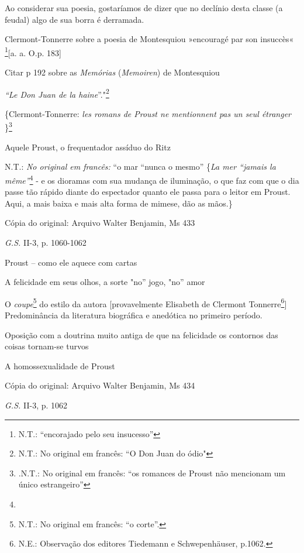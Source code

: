 Ao considerar sua poesia, gostaríamos de dizer que no declínio desta
classe (a feudal) algo de sua borra é derramada.

Clermont-Tonnerre sobre a poesia de Montesquiou »encouragé par son
insuccès« \footnote{N.T.: ``encorajado pelo seu insucesso''}{[}a. a.
O.p. 183{]}

Citar p 192 sobre as \emph{Memórias} (\emph{Memoiren}) de Montesquiou

\emph{``Le Don Juan de la haine}''."\footnote{N.T.: No original em
  francês: ``O Don Juan do ódio"}

\{Clermont-Tonnerre: \emph{les romans de Proust ne mentionnent pas un
seul étranger} \}\footnote{.N.T.: No original em francês: ``os romances
  de Proust não mencionam um único estrangeiro''}

Aquele Proust, o frequentador assíduo do Ritz

N.T.: \emph{No original em francês:} ``o mar ``nunca o mesmo''
\{\emph{La mer ``jamais la même''}\footnote{} - e os dioramas com sua
mudança de iluminação, o que faz com que o dia passe tão rápido diante
do espectador quanto ele passa para o leitor em Proust. Aqui, a mais
baixa e mais alta forma de mimese, dão as mãos.\}

Cópia do original: Arquivo Walter Benjamin, Ms 433

\emph{G.S.} II-3, p. 1060-1062

Proust -- como ele aquece com cartas

A felicidade em seus olhos, a sorte "no'' jogo, "no'' amor

O \emph{coupe}\footnote{N.T.: No original em francês: ``o corte''.} do
estilo da autora {[}provavelmente Elisabeth de Clermont
Tonnerre\footnote{N.E.: Observação dos editores Tiedemann e
  Schwepenhäuser, p.1062.}{]} Predominância da literatura biográfica e
anedótica no primeiro período.

Oposição com a doutrina muito antiga de que na felicidade os contornos
das coisas tornam-se turvos

A homossexualidade de Proust

Cópia do original: Arquivo Walter Benjamin, Ms 434

\emph{G.S.} II-3, p. 1062

